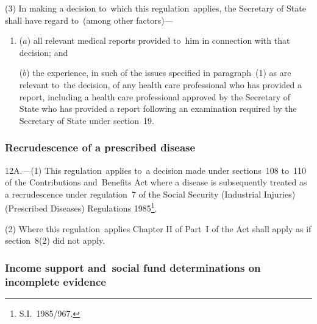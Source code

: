 \documentclass[12pt,a4paper]{article}
\begin{document}
(3) In making a decision to~which this regulation~applies, the Secretary of State shall have regard to~(among other factors)—
\begin{enumerate}\item[]
($a$) all relevant medical reports provided to~him in connection with that decision; and

($b$) the experience, in such of the issues specified in paragraph~(1) as are relevant to~the decision, of any 
health care professional  %
who has provided a report, including a 
health care professional approved by the Secretary of State  %
who has provided a report following an examination required by the Secretary of State under section~19.
\end{enumerate}


\subsubsection[12A. Recrudescence of a prescribed disease]{Recrudescence of a prescribed disease}

12A.---(1)  This regulation~applies to~a decision made under sections~108 to~110 of the Contributions and~Benefits Act where a disease is subsequently treated as a recrudescence under regulation~7 of the Social Security (Industrial Injuries) (Prescribed Diseases) Regulations 1985\footnote{\frenchspacing S.I.~1985/967.}.

\pagebreak[3]

(2) Where this regulation~applies Chapter II of Part~I of the Act shall apply as if section~8(2) did not apply.


\subsubsection[13. Income support and~social fund determinations on incomplete evidence]{\sloppy Income support and~social fund determinations on incomplete evidence}
\end{document}
